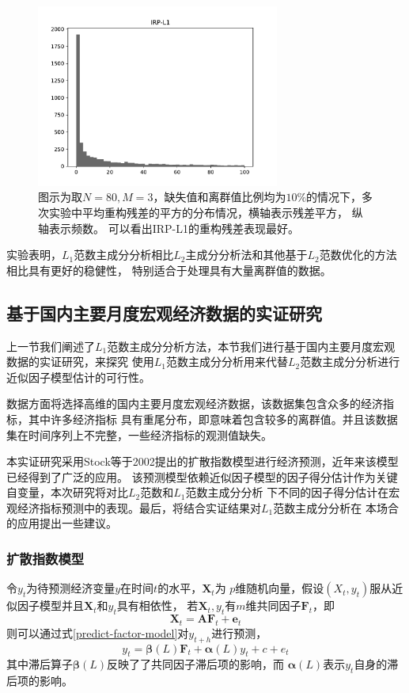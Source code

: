 \begin{figure}[H]
\begin{minipage}[t]{0.48\textwidth}
    \includegraphics[width=8cm]{pics/lab1/IRP-L1.pdf}
    \end{minipage}
    \caption{\small 图示为取$N = 80, M=3$，缺失值和离群值比例均为$10\%$的情况下，多次实验中平均重构残差的平方的分布情况，横轴表示残差平方，
    纵轴表示频数。
    可以看出IRP-L1的重构残差表现最好。}
\end{figure}

实验表明，$L_1$范数主成分分析相比$L_2$主成分分析法和其他基于$L_2$范数优化的方法相比具有更好的稳健性，
特别适合于处理具有大量离群值的数据。

\subsection{基于国内主要月度宏观经济数据的实证研究}
上一节我们阐述了$L_1$范数主成分分析方法，本节我们进行基于国内主要月度宏观数据的实证研究，来探究
使用$L_1$范数主成分分析用来代替$L_2$范数主成分分析进行近似因子模型估计的可行性。

数据方面将选择高维的国内主要月度宏观经济数据，该数据集包含众多的经济指标，其中许多经济指标
具有重尾分布，即意味着包含较多的离群值。并且该数据集在时间序列上不完整，一些经济指标的观测值缺失。

本实证研究采用Stock等于2002提出的扩散指数模型进行经济预测，近年来该模型已经得到了广泛的应用。
该预测模型依赖近似因子模型的因子得分估计作为关键自变量，本次研究将对比$L_2$范数和$L_1$范数主成分分析
下不同的因子得分估计在宏观经济指标预测中的表现。最后，将结合实证结果对$L_1$范数主成分分析在
本场合的应用提出一些建议。

\subsubsection{扩散指数模型}
令$y_t$为待预测经济变量$y$在时间$t$的水平，$\bm{X}_t$为
$p$维随机向量，假设$(X_t,y_t)$服从近似因子模型并且$\bm{X}_t$和$y_t$具有相依性，
若$\bm{X}_t, y_t$有$m$维共同因子$\bm{F}_t$，即
\begin{equation}
    \bm{X}_t = \bm{A}\bm{F}_t + \bm{e}_t
\end{equation}
则可以通过式\eqref{predict-factor-model}对$y_{t+h}$进行预测，
\begin{equation}\label{predict-factor-model}
    y_t = \bm{\beta}(L)\bm{F}_t + \bm{\alpha}(L)y_t + c + e_t
\end{equation}
其中滞后算子$\bm{\beta}(L)$反映了了共同因子滞后项的影响，而
$\bm{\alpha}(L)$表示$y_t$自身的滞后项的影响。

